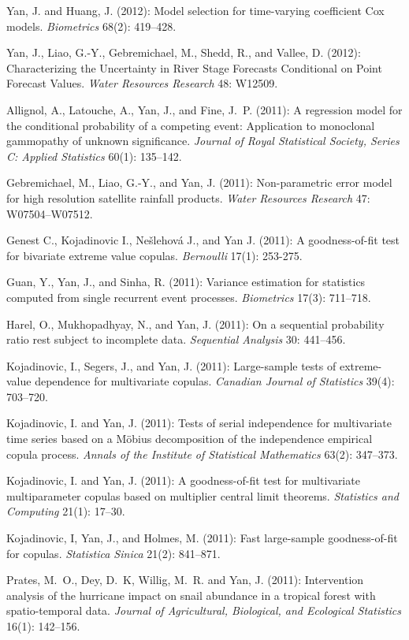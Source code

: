 \documentclass[Statistics]{vita}
\begin{document}
\begin{vita}
\begin{Publications}
\begin{RefereedJournalArticles}
  \item Yan, J. and Huang, J. (2012): Model selection for time-varying coefficient Cox models. {\em Biometrics\/} 68(2): 419--428.
  \item Yan, J., Liao, G.-Y., Gebremichael, M., Shedd, R., and Vallee, D. (2012): Characterizing the Uncertainty in River Stage Forecasts Conditional on Point Forecast Values. {\em Water Resources Research\/} 48: W12509.
  \item Allignol, A., Latouche, A., Yan, J., and Fine, J.~P. (2011):  A regression model for the conditional probability of a competing event: {A}pplication to monoclonal gammopathy of unknown significance. {\em Journal of Royal Statistical Society, Series C: Applied Statistics\/}  60(1): 135--142.
  \item Gebremichael, M., Liao, G.-Y., and Yan, J. (2011): Non-parametric error model for high resolution satellite rainfall products. {\em Water Resources Research\/} 47: W07504--W07512.
  \item Genest C., Kojadinovic I., Ne\v{s}lehov\'a J., and Yan J. (2011): A goodness-of-fit test for bivariate extreme value copulas. {\em Bernoulli\/} 17(1): 253-275.
  \item Guan, Y., Yan, J., and Sinha, R. (2011): Variance estimation for statistics computed from single recurrent event processes. {\em Biometrics\/} 17(3): 711--718.
  \item Harel, O., Mukhopadhyay, N., and Yan, J. (2011): On a sequential probability ratio rest subject to incomplete data. {\em Sequential Analysis\/} 30: 441--456.
  \item Kojadinovic, I., Segers, J., and Yan, J. (2011): Large-sample tests of extreme-value dependence for multivariate copulas. {\em Canadian Journal of Statistics\/} 39(4): 703--720.
  \item Kojadinovic, I. and Yan, J. (2011): Tests of serial independence for multivariate time series based on a {M\"obius} decomposition of the independence empirical copula process. {\em Annals of the Institute of Statistical Mathematics\/} 63(2): 347--373.
  \item Kojadinovic, I. and Yan, J. (2011): A goodness-of-fit test for multivariate multiparameter copulas based on multiplier central limit theorems. {\em Statistics and Computing\/} 21(1): 17--30.
  \item Kojadinovic, I, Yan, J., and Holmes, M. (2011): Fast large-sample goodness-of-fit for copulas. {\em Statistica Sinica\/} 21(2): 841--871.
  \item *Prates, M.~O., Dey, D.~K, Willig, M.~R. and Yan, J. (2011): Intervention analysis of the hurricane impact on snail abundance in a tropical forest with spatio-temporal data.  {\em Journal of Agricultural, Biological, and Ecological Statistics\/} 16(1): 142--156.

\end{RefereedJournalArticles}
\end{Publications}
\end{vita}
\end{document}
